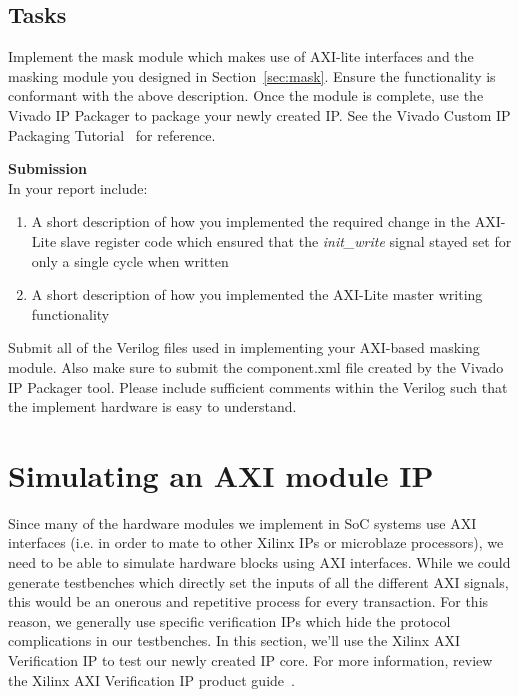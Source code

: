 \documentclass{article}
\begin{document}
\subsection{Tasks}
Implement the mask module which makes use of AXI-lite interfaces and the masking module you designed in Section~\ref{sec:mask}. Ensure the functionality is conformant with the above description. Once the module is complete, use the Vivado IP Packager to package your newly created IP. See the Vivado Custom IP Packaging Tutorial~\cite{xilinxpacktut} for reference.
\\

\begin{minipage}{\textwidth}
\noindent\textbf{Submission}\\
In your report include:
\begin{enumerate}
\item A short description of how you implemented the required change in the AXI-Lite slave register code which ensured that the \textit{init\_write} signal stayed set for only a single cycle when written
\item A short description of how you implemented the AXI-Lite master writing functionality
\end{enumerate}
Submit all of the Verilog files used in implementing your AXI-based masking module. Also make sure to submit the component.xml file created by the Vivado IP Packager tool. Please include sufficient comments within the Verilog such that the implement hardware is easy to understand.
\end{minipage}


\section{Simulating an AXI module IP}
Since many of the hardware modules we implement in SoC systems use AXI interfaces (i.e. in order to mate to other Xilinx IPs or microblaze processors), we need to be able to simulate hardware blocks using AXI interfaces. While we could generate testbenches which directly set the inputs of all the different AXI signals, this would be an onerous and repetitive process for every transaction. For this reason, we generally use specific verification IPs which hide the protocol complications in our testbenches. In this section, we'll use the Xilinx AXI Verification IP to test our newly created IP core. For more information, review the Xilinx AXI Verification IP product guide~\cite{xilinxvip}.
\end{document}
